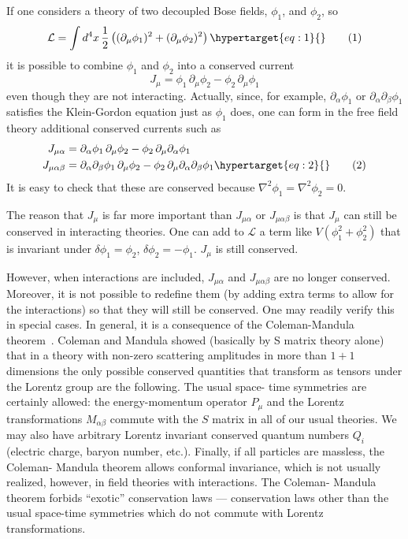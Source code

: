 \documentclass[11pt,a4paper]{article}
\newcommand{\eqtarget}[1]{\hypertarget{eq:#1}{\mathstrut}\tag{#1}}
\begin{document}
If one considers a theory of two decoupled Bose fields, $\phi_1$, and
$\phi_2$, so
\begin{equation}
\mathcal{L} = \int d^4x \, \frac{1}{2}\left((\partial_\mu \phi_1)^2 + (\partial_\mu \phi_2)^2\right)
\eqtarget{1}
\end{equation}
it is possible to combine $\phi_1$ and $\phi_2$ into a conserved current
\[
J_\mu = \phi_1\, \partial_\mu \phi_2 - \phi_2\, \partial_\mu \phi_1
\]
even though they are not interacting.
Actually, since, for example, $\partial_\alpha \phi_1$ or
$\partial_\alpha \partial_\beta \phi_1$ satisfies the Klein-Gordon
equation just as $\phi_1$ does, one can form in the free field
theory additional conserved currents such as
\begin{align}
J_{\mu\alpha} &= \partial_\alpha \phi_1\, \partial_\mu \phi_2 - \phi_2\, \partial_\mu \partial_\alpha \phi_1 \notag\\
J_{\mu\alpha\beta} &= \partial_\alpha \partial_\beta \phi_1\, \partial_\mu \phi_2 - \phi_2\, \partial_\mu \partial_\alpha \partial_\beta \phi_1
\eqtarget{2}
\end{align}
It is easy to check that these are conserved because
$\nabla^2 \phi_1 = \nabla^2 \phi_2 = 0$.

The reason that $J_\mu$ is far more important than $J_{\mu\alpha}$ or
$J_{\mu\alpha\beta}$ is that $J_\mu$ can still be conserved in interacting
theories. One can add to $\mathcal{L}$ a term like $V(\phi_1^2 + \phi_2^2)$
that is invariant under $\delta \phi_1 = \phi_2$, $\delta \phi_2 = -\phi_1$.
$J_\mu$ is still conserved.

However, when interactions are included, $J_{\mu\alpha}$ and $J_{\mu\alpha\beta}$
are no longer conserved. Moreover, it is not possible to redefine them (by
adding extra terms to allow for the interactions) so that they will still be
conserved. One may readily verify this in special cases. In general, it is a
consequence of the Coleman-Mandula theorem~\cite{ref3}. Coleman and
Mandula showed (basically by S matrix theory alone) that in a theory with
non-zero scattering amplitudes in more than $1+1$ dimensions the only possible conserved quantities that transform as
tensors under the Lorentz group are the following. The usual space-
time symmetries are certainly allowed: the energy-momentum operator
$P_\mu$ and the Lorentz transformations $M_{\alpha\beta}$ commute with the
$S$ matrix in all of our usual theories. We may also have arbitrary Lorentz
invariant conserved quantum numbers $Q_i$ (electric charge, baryon
number, etc.). Finally, if all particles are massless, the Coleman-
Mandula theorem allows conformal invariance, which is not usually
realized, however, in field theories with interactions. The Coleman-
Mandula theorem forbids ``exotic'' conservation laws --- conservation
laws other than the usual space-time symmetries which do not commute
with Lorentz transformations.
\end{document}
